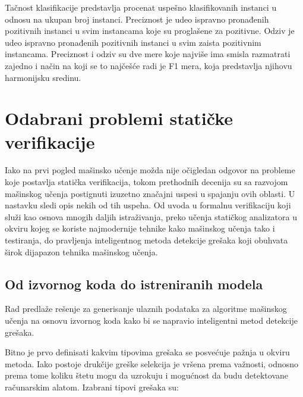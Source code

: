\documentclass[a4paper]{article}
\theoremstyle{definition}
\begin{document}
{%
Tačnost klasifikacije predstavlja procenat uspešno klasifikovanih instanci u odnosu 
na ukupan broj instanci. Preciznost je udeo ispravno pronađenih pozitivnih instanci 
u svim instancama koje su proglašene za pozitivne. Odziv je udeo ispravno pronađenih 
pozitivnih instanci u svim zaista pozitivnim instancama. Preciznost i odziv su dve 
mere koje najviše ima smisla razmatrati zajedno i način na koji se to najčešće radi 
je F1 mera, koja predstavlja njihovu harmonijsku sredinu.



\section{Odabrani problemi statičke verifikacije}
\label{sec:naslovN}


Iako na prvi pogled mašinsko učenje možda nije očigledan odgovor na probleme
koje postavlja statička verifikacija, tokom prethodnih decenija su sa razvojom
mašinskog učenja postignuti izuzetno značajni uspesi u spajanju ovih oblasti.
U nastavku sledi opis nekih od tih uspeha. Od uvoda u formalnu verifikaciju koji 
služi kao osnova mnogih daljih istraživanja, preko učenja statičkog analizatora u okviru
kojeg se koriste najmodernije tehnike kako mašinskog učenja tako i testiranja,
do pravljenja inteligentnog metoda detekcije grešaka koji obuhvata širok dijapazon
tehnika mašinskog učenja.


\subsection{Od izvornog koda do istreniranih modela}
\label{subsec:pregled}

Rad \cite{staticFeatures} predlaže rešenje za generisanje ulaznih podataka za algoritme mašinskog učenja na osnovu
izvornog koda kako bi se napravio inteligentni metod detekcije grešaka.

Bitno je prvo definisati kakvim tipovima grešaka se posvećuje pažnja u okviru metoda.
Iako postoje drukčije greške selekcija je vršena prema važnosti, odnosno prema tome
koliku štetu mogu da uzrokuju i mogućnost da budu detektovane računarskim alatom. Izabrani tipovi grešaka su:

}
\end{document}

